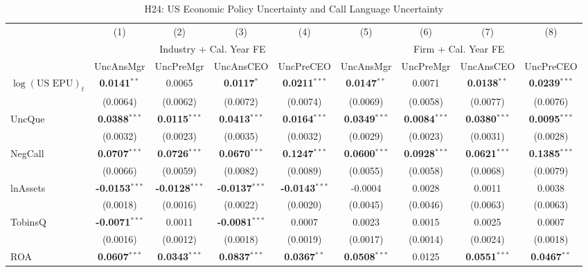 \documentclass[11pt,a4paper]{article}
\begin{document}
\clearpage
\begin{table}[htbp]
\centering
\caption{H24: US Economic Policy Uncertainty and Call Language Uncertainty}
\label{tab:h24_us_epu}
\scriptsize
\begin{tabular}{lcccccccc}
\toprule
 & (1) & (2) & (3) & (4) & (5) & (6) & (7) & (8) \\
 & \multicolumn{4}{c}{Industry + Cal. Year FE} & \multicolumn{4}{c}{Firm + Cal. Year FE} \\
\cmidrule(lr){2-5} \cmidrule(lr){6-9}
 & UncAnsMgr & UncPreMgr & UncAnsCEO & UncPreCEO & UncAnsMgr & UncPreMgr & UncAnsCEO & UncPreCEO \\
\midrule
$\log(\text{US EPU})_{t}$ & \textbf{0.0141}$^{**}$ & 0.0065 & \textbf{0.0117}$^{*}$ & \textbf{0.0211}$^{***}$ & \textbf{0.0147}$^{**}$ & 0.0071 & \textbf{0.0138}$^{**}$ & \textbf{0.0239}$^{***}$ \\
 & (0.0064) & (0.0062) & (0.0072) & (0.0074) & (0.0069) & (0.0058) & (0.0077) & (0.0076) \\
\midrule
UncQue & \textbf{0.0388}$^{***}$ & \textbf{0.0115}$^{***}$ & \textbf{0.0413}$^{***}$ & \textbf{0.0164}$^{***}$ & \textbf{0.0349}$^{***}$ & \textbf{0.0084}$^{***}$ & \textbf{0.0380}$^{***}$ & \textbf{0.0095}$^{***}$ \\
 & (0.0032) & (0.0023) & (0.0035) & (0.0032) & (0.0029) & (0.0023) & (0.0031) & (0.0028) \\
NegCall & \textbf{0.0707}$^{***}$ & \textbf{0.0726}$^{***}$ & \textbf{0.0670}$^{***}$ & \textbf{0.1247}$^{***}$ & \textbf{0.0600}$^{***}$ & \textbf{0.0928}$^{***}$ & \textbf{0.0621}$^{***}$ & \textbf{0.1385}$^{***}$ \\
 & (0.0066) & (0.0059) & (0.0082) & (0.0089) & (0.0055) & (0.0058) & (0.0068) & (0.0079) \\
lnAssets & \textbf{-0.0153}$^{***}$ & \textbf{-0.0128}$^{***}$ & \textbf{-0.0137}$^{***}$ & \textbf{-0.0143}$^{***}$ & -0.0004 & 0.0028 & 0.0011 & 0.0038 \\
 & (0.0018) & (0.0016) & (0.0022) & (0.0020) & (0.0045) & (0.0046) & (0.0063) & (0.0063) \\
TobinsQ & \textbf{-0.0071}$^{***}$ & 0.0011 & \textbf{-0.0081}$^{***}$ & 0.0007 & 0.0023 & 0.0015 & 0.0025 & 0.0007 \\
 & (0.0016) & (0.0012) & (0.0018) & (0.0019) & (0.0017) & (0.0014) & (0.0024) & (0.0018) \\
ROA & \textbf{0.0607}$^{***}$ & \textbf{0.0343}$^{***}$ & \textbf{0.0837}$^{***}$ & \textbf{0.0367}$^{**}$ & \textbf{0.0508}$^{***}$ & 0.0125 & \textbf{0.0551}$^{***}$ & \textbf{0.0467}$^{**}$ \\

\end{tabular}
\end{table}
\end{document}
